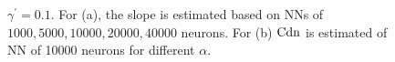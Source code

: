\documentclass{article}
\begin{document}
\begin{figure}
    \begin{centering}
        \par\end{centering}
    \caption{$\gamma^{\prime}=0.1$. For (a), the slope is estimated based on NNs of $1000,5000,10000,20000,40000$ neurons. For (b) ${\rm Cdn}$ is estimated of NN of 10000 neurons for different $\alpha$. \label{fig:diffbeta} }
\end{figure}
\end{document}

